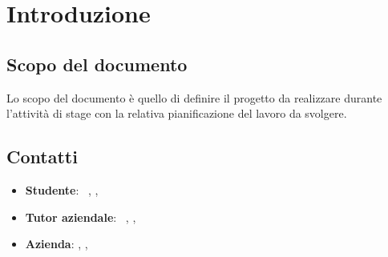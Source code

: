 \section{Introduzione}
\subsection{Scopo del documento}
Lo scopo del documento è quello di definire il progetto da realizzare durante l'attività di stage con la relativa pianificazione del lavoro da svolgere. 
\subsection{Contatti}
\begin{itemize}
	\item \textbf{Studente}: \nomeStudente\ \cognomeStudente, \href{mailto:\emailStudente}{\emailStudente}, \telStudente \\
	\item \textbf{Tutor aziendale}: \nomeTutorAziendale\ \cognomeTutorAziendale, \href{mailto:\emailTutorAziendale}{\emailTutorAziendale}, \telTutorAziendale \\
	\item \textbf{Azienda}: \ragioneSocAzienda, \indirizzoAzienda, \href{\sitoAzienda}{\sitoAzienda}	
\end{itemize}
